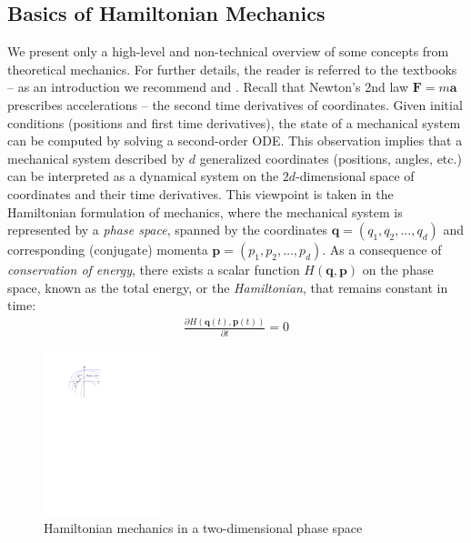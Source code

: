 \documentclass[12pt,final,3p]{elsarticle}
\begin{document}
\subsection{Basics of Hamiltonian Mechanics}
We present only a high-level and non-technical overview of some concepts from theoretical mechanics. For further details, the reader is referred to the textbooks -- as an introduction we recommend \cite{susskind2013theoretical} and \cite{hand1998analytical}. Recall that Newton's 2nd law $\mathbf{F} = m\mathbf{a}$ prescribes accelerations -- the second time derivatives of coordinates. Given initial conditions (positions and first time derivatives), the state of a mechanical system can be computed by solving a second-order ODE. This observation implies that a mechanical system described by $d$ generalized coordinates (positions, angles, etc.) can be interpreted as a dynamical system on the $2d$-dimensional space of coordinates and their time derivatives. This viewpoint is taken in the Hamiltonian formulation of mechanics, where the mechanical system is represented by a \emph{phase space}, spanned by the coordinates $\mathbf{q} = (q_{1}, q_{2}, \ldots, q_{d})$ and corresponding (conjugate) momenta $\mathbf{p} = (p_{1}, p_{2}, \ldots, p_{d})$. As a consequence of \emph{conservation of energy}, there exists a scalar function $H(\mathbf{q},\mathbf{p})$ on the phase space, known as the total energy, or the \emph{Hamiltonian}, that remains constant in time:
\begin{align}
\frac{\partial H(\mathbf{q}(t),\mathbf{p}(t))}{\partial t} = 0
\end{align}

\begin{figure}[h]
	\centering
	\includegraphics[width=0.3\textwidth, keepaspectratio]{figures/hamiltonian2.pdf}
	\caption{Hamiltonian mechanics in a two-dimensional phase space}
	\label{fig:hamiltonian}
\end{figure}
\end{document}
